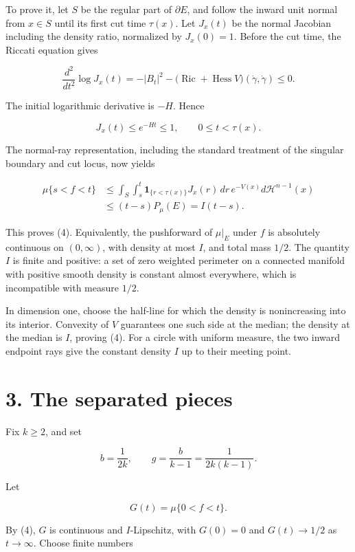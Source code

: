 \documentclass[11pt,a4paper]{article}
\begin{document}
To prove it, let \(S\) be the regular part of \(\partial E\), and follow
the inward unit normal from \(x\in S\) until its first cut time
\(\tau(x)\). Let \(J_x(t)\) be the normal Jacobian including the density
ratio, normalized by \(J_x(0)=1\). Before the cut time, the Riccati
equation gives

\[
\frac{d^2}{dt^2}\log J_x(t)
=-|B_t|^2
-\bigl(\operatorname{Ric}+\operatorname{Hess}V\bigr)(\dot\gamma,\dot\gamma)
\leq0.
\]

The initial logarithmic derivative is \(-H\). Hence

\[
J_x(t)\leq e^{-Ht}\leq1,
\qquad 0\leq t<\tau(x).
\tag{5}
\]

The normal-ray representation, including the standard treatment of the
singular boundary and cut locus, now yields

\[
\begin{aligned}
\mu\{s<f<t\}
&\leq\int_S\int_s^t
\mathbf1_{\{r<\tau(x)\}}J_x(r)\,dr\,
 e^{-V(x)}d\mathcal H^{n-1}(x)\\
&\leq(t-s)P_\mu(E)=I(t-s).
\end{aligned}
\]

This proves (4). Equivalently, the pushforward of \(\mu|_E\) under \(f\)
is absolutely continuous on \((0,\infty)\), with density at most \(I\),
and total mass \(1/2\). The quantity \(I\) is finite and positive: a set
of zero weighted perimeter on a connected manifold with positive smooth
density is constant almost everywhere, which is incompatible with
measure \(1/2\).

In dimension one, choose the half-line for which the density is
nonincreasing into its interior. Convexity of \(V\) guarantees one such
side at the median; the density at the median is \(I\), proving (4). For
a circle with uniform measure, the two inward endpoint rays give the
constant density \(I\) up to their meeting point.

\hypertarget{1013-the-separated-pieces}{%
\section{3. The separated pieces}\label{1013-the-separated-pieces}}

Fix \(k\geq2\), and set

\[
b=\frac1{2k},
\qquad
g=\frac{b}{k-1}=\frac1{2k(k-1)}.
\tag{6}
\]

Let

\[
G(t)=\mu\{0<f<t\}.
\]

By (4), \(G\) is continuous and \(I\)-Lipschitz, with \(G(0)=0\) and
\(G(t)\to1/2\) as \(t\to\infty\). Choose finite numbers
\end{document}

